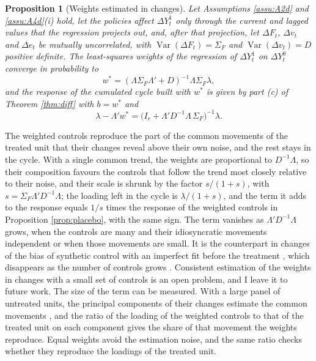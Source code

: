 \documentclass[12pt,a4paper]{article}
\newtheorem{prop}{Proposition}
\theoremstyle{definition}
\theoremstyle{definition}\newtheorem{example}{Example}
\theoremstyle{definition}\newtheorem{definition}{Definition}
\begin{document}
\begin{prop}[Weights estimated in changes\label{prop:wchanges}]
Let Assumptions \ref{assu:A2d} and \ref{assu:A4d}(i) hold, let the policies affect $\Delta Y^1_t$ only through the current and lagged values that the regression projects out, and, after that projection, let $\Delta F_t$, $\Delta v_t$ and $\Delta e_t$ be mutually uncorrelated, with $\operatorname{Var}(\Delta F_t)=\Sigma_F$ and $\operatorname{Var}(\Delta v_t)=D$ positive definite. The least-squares weights of the regression of $\Delta Y^1_t$ on $\Delta Y^0_t$ converge in probability to
\begin{equation*}
w^\ast=(\Lambda\Sigma_F\Lambda'+D)^{-1}\Lambda\Sigma_F\lambda,
\end{equation*}
and the response of the cumulated cycle built with $w^\ast$ is given by part (c) of Theorem \ref{thm:diff} with $b=w^\ast$ and
\begin{equation*}
\lambda-\Lambda'w^\ast=\big(I_r+\Lambda'D^{-1}\Lambda\,\Sigma_F\big)^{-1}\lambda .
\end{equation*}
\end{prop}

The weighted controls reproduce the part of the common movements of the treated unit that their changes reveal above their own noise, and the rest stays in the cycle. With a single common trend, the weights are proportional to $D^{-1}\Lambda$, so their composition favours the controls that follow the trend most closely relative to their noise, and their scale is shrunk by the factor $s/(1+s)$, with $s=\Sigma_F\Lambda'D^{-1}\Lambda$; the loading left in the cycle is $\lambda/(1+s)$, and the term it adds to the response equals $1/s$ times the response of the weighted controls in Proposition \ref{prop:placebo}, with the same sign. The term vanishes as $\Lambda'D^{-1}\Lambda$ grows, when the controls are many and their idiosyncratic movements independent or when those movements are small. It is the counterpart in changes of the bias of synthetic control with an imperfect fit before the treatment \citep{FermanPinto2021}, which disappears as the number of controls grows \citep{Ferman2021}. Consistent estimation of the weights in changes with a small set of controls is an open problem, and I leave it to future work. The size of the term can be measured. With a large panel of untreated units, the principal components of their changes estimate the common movements \citep{Bai2003}, and the ratio of the loading of the weighted controls to that of the treated unit on each component gives the share of that movement the weights reproduce. Equal weights avoid the estimation noise, and the same ratio checks whether they reproduce the loadings of the treated unit.
\end{document}
